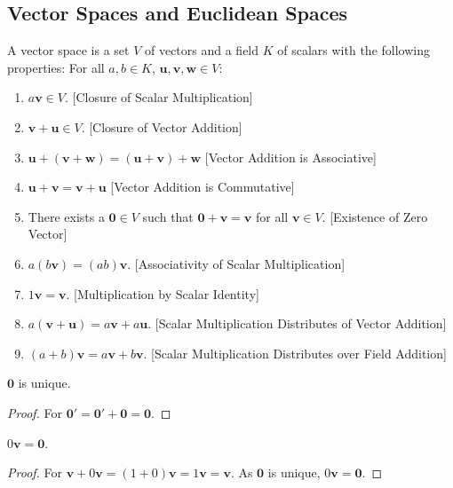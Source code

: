 \documentclass[crop=false,class=book,oneside]{standalone}
\begin{document}
        \subsection{Vector Spaces and Euclidean Spaces}
            \begin{definition}
            A vector space is a set $V$ of vectors and a field $K$ of scalars with the following properties: For all $a,b\in K$, $\mathbf{u,v,w}\in V$:
            \begin{enumerate}
                \item $a\mathbf{v} \in V$. \hfill [Closure of Scalar Multiplication]
                \item $\mathbf{v}+\mathbf{u} \in V$. \hfill [Closure of Vector Addition]
                \item $\mathbf{u}+(\mathbf{v}+\mathbf{w}) = (\mathbf{u}+\mathbf{v})+\mathbf{w}$ \hfill [Vector Addition is Associative]
                \item $\mathbf{u}+\mathbf{v}=\mathbf{v}+\mathbf{u}$ \hfill [Vector Addition is Commutative]
                \item There exists a $\mathbf{0}\in V$ such that $\mathbf{0}+\mathbf{v}=\mathbf{v}$ for all $\mathbf{v}\in V$. \hfill [Existence of Zero Vector]
                \item $a(b\mathbf{v}) = (ab)\mathbf{v}$. \hfill [Associativity of Scalar Multiplication]
                \item $1 \mathbf{v} = \mathbf{v}$. \hfill[Multiplication by Scalar Identity]
                \item $a(\mathbf{v}+\mathbf{u}) = a\mathbf{v}+a\mathbf{u}$. \hfill [Scalar Multiplication Distributes of Vector Addition]
                \item $(a+b)\mathbf{v}= a\mathbf{v}+b\mathbf{v}$. \hfill [Scalar Multiplication Distributes over Field Addition]
            \end{enumerate}
            \end{definition}
            \begin{theorem}
            $\mathbf{0}$ is unique.
            \end{theorem}
            \begin{proof}
            For $\mathbf{0}'=\mathbf{0}'+\mathbf{0}=\mathbf{0}$.
            \end{proof}
            \begin{theorem}
            $0\mathbf{v} = \mathbf{0}$.
            \end{theorem}
            \begin{proof}
            For $\mathbf{v}+0\mathbf{v} = (1+0)\mathbf{v} = 1\mathbf{v} = \mathbf{v}$. As $\mathbf{0}$ is unique, $0\mathbf{v}=\mathbf{0}$.
            \end{proof}
\end{document}

